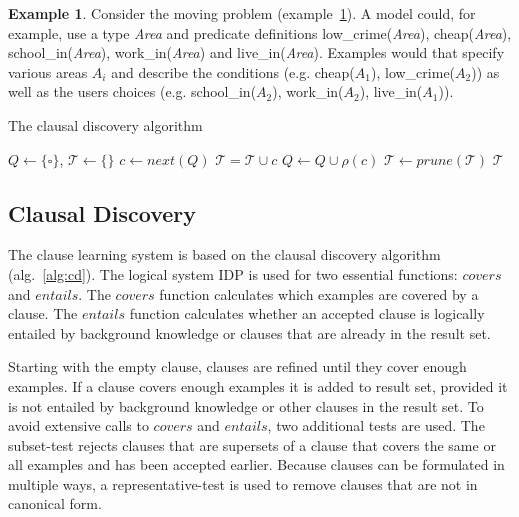 \documentclass[letterpaper]{article}
\newcommand{\sym}[1]{\ensuremath{\mathcal{#1}}}
\theoremstyle{definition}
\newtheorem{example}{Example}
\begin{document}
\begin{example}
  \label{ex:moving-input}
  Consider the moving problem (example~\ref{ex:moving-input}).
  A model could, for example, use a type \textit{Area} and predicate definitions low\_crime(\textit{Area}), cheap(\textit{Area}), school\_in(\textit{Area}), work\_in(\textit{Area}) and live\_in(\textit{Area}).
  Examples would that specify various areas $A_i$ and describe the conditions (e.g. cheap($A_1$), low\_crime($A_2$)) as well as the users choices (e.g. school\_in($A_2$), work\_in($A_2$), live\_in($A_1$)).
\end{example}

\begin{algorithm}
  \caption{The clausal discovery algorithm}
  \label{alg:cd}

  \begin{algorithmic}
  \State $Q \gets \{\square\}$, $\sym{T} \gets \{\}$
    \State $c \gets next(Q)$
      \If{$\lnot entails(\sym{T}, c)$}
        \State $\sym{T} = \sym{T} \cup c$
      \EndIf
    \Else
      \State $Q \gets Q \cup \rho(c)$
    \EndIf
  \EndWhile
  \State $\sym{T} \gets prune(\sym{T})$
  \State \Return \sym{T}
  \end{algorithmic}
\end{algorithm}

\subsection{Clausal Discovery}
The clause learning system is based on the clausal discovery algorithm (alg.~\ref{alg:cd}).
The logical system IDP is used for two essential functions: $\mathit{covers}$ and $\mathit{entails}$.
The $\mathit{covers}$ function calculates which examples are covered by a clause.
The $\mathit{entails}$ function calculates whether an accepted clause is logically entailed by background knowledge or clauses that are already in the result set.

Starting with the empty clause, clauses are refined until they cover enough examples.
If a clause covers enough examples it is added to result set, provided it is not entailed by background knowledge or other clauses in the result set.
To avoid extensive calls to $\mathit{covers}$ and $\mathit{entails}$, two additional tests are used.
The subset-test rejects clauses that are supersets of a clause that covers the same or all examples and has been accepted earlier.
Because clauses can be formulated in multiple ways, a representative-test is used to remove clauses that are not in canonical form.
\end{document}

